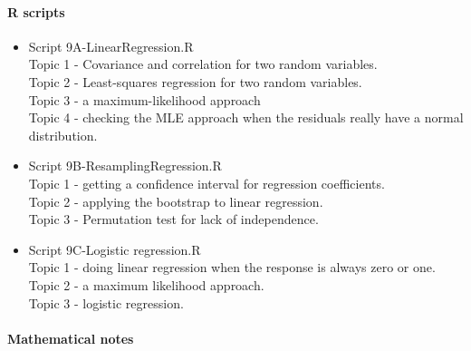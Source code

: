 \documentclass[12pt]{article}
\begin{document}
\paragraph*{R scripts}
\begin{itemize}
\item Script 9A-LinearRegression.R\\
Topic 1 - Covariance and correlation for two random variables.\\
Topic 2 - Least-squares regression for two random variables.\\
Topic 3 - a maximum-likelihood approach\\
Topic 4 - checking the MLE approach when the residuals really have a normal distribution.

\item Script 9B-ResamplingRegression.R\\
Topic 1 - getting a confidence interval for regression coefficients.\\
Topic 2 - applying the bootstrap to linear regression.\\
Topic 3 - Permutation test for lack of independence.

\item Script 9C-Logistic regression.R\\
Topic 1 - doing linear regression when the response is always zero or one.\\
Topic 2 - a maximum likelihood approach.\\
Topic 3 - logistic regression.

\end{itemize}

\pagebreak





\paragraph*{Mathematical notes}
\end{document}

